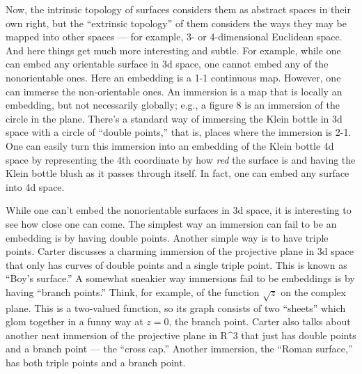 \documentclass{article}
\begin{document}
Now, the intrinsic topology of surfaces considers them as abstract
spaces in their own right, but the ``extrinsic topology'' of them
considers the ways they may be mapped into other spaces --- for example,
3- or 4-dimensional Euclidean space. And here things get much more
interesting and subtle. For example, while one can embed any orientable
surface in 3d space, one cannot embed any of the nonorientable ones.
Here an embedding is a 1-1 continuous map. However, one can immerse the
non-orientable ones. An immersion is a map that is locally an embedding,
but not necessarily globally; e.g., a figure 8 is an immersion of the
circle in the plane. There's a standard way of immersing the Klein
bottle in 3d space with a circle of ``double points,'' that is, places
where the immersion is 2-1. One can easily turn this immersion into an
embedding of the Klein bottle 4d space by representing the 4th
coordinate by how \emph{red} the surface is and having the Klein bottle
blush as it passes through itself. In fact, one can embed any surface
into 4d space.

While one can't embed the nonorientable surfaces in 3d space, it is
interesting to see how close one can come. The simplest way an immersion
can fail to be an embedding is by having double points. Another simple
way is to have triple points. Carter discusses a charming immersion of
the projective plane in 3d space that only has curves of double points
and a single triple point. This is known as ``Boy's surface.'' A
somewhat sneakier way immersions fail to be embeddings is by having
``branch points.'' Think, for example, of the function \(\sqrt{z}\) on
the complex plane. This is a two-valued function, so its graph consists
of two ``sheets'' which glom together in a funny way at \(z = 0\), the
branch point. Carter also talks about another neat immersion of the
projective plane in R\^{}3 that just has double points and a branch
point --- the ``cross cap.'' Another immersion, the ``Roman surface,''
has both triple points and a branch point.
\end{document}
